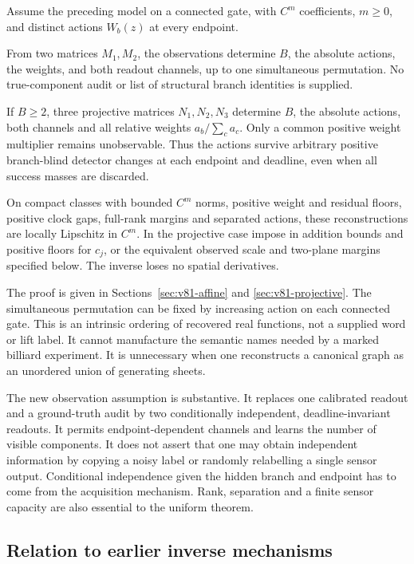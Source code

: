 \begin{theorem}\label{thm:v81-main}
Assume the preceding model on a connected gate, with $C^m$ coefficients,
$m\ge0$, and distinct actions $W_b(z)$ at every endpoint.

From two matrices $M_1,M_2$, the observations determine $B$, the absolute
actions, the weights, and both readout channels, up to one simultaneous
permutation.  No true-component audit or list of structural branch
identities is supplied.

If $B\ge2$, three projective matrices $N_1,N_2,N_3$ determine $B$, the
absolute actions, both channels and all relative weights $a_b/\sum_c a_c$.
Only a common positive weight multiplier remains unobservable.  Thus
the actions survive arbitrary positive branch-blind detector changes at
each endpoint and deadline, even when all success masses are discarded.

On compact classes with bounded $C^m$ norms, positive weight and residual
floors, positive clock gaps, full-rank margins and separated actions,
these reconstructions are locally Lipschitz in $C^m$.  In the projective
case impose in addition bounds and positive floors for $c_j$, or the
equivalent observed scale and two-plane margins specified below.  The
inverse loses no spatial derivatives.
\end{theorem}

The proof is given in Sections~\ref{sec:v81-affine} and
\ref{sec:v81-projective}.  The simultaneous permutation can be fixed by
increasing action on each connected gate.  This is an intrinsic ordering
of recovered real functions, not a supplied word or lift label.  It
cannot manufacture the semantic names needed by a marked billiard
experiment.  It is unnecessary when one reconstructs a canonical graph
as an unordered union of generating sheets.

The new observation assumption is substantive.  It replaces one
calibrated readout and a ground-truth audit by two conditionally
independent, deadline-invariant readouts.  It permits endpoint-dependent
channels and learns the number of visible components.  It does not
assert that one may obtain independent information by copying a noisy
label or randomly relabelling a single sensor output.  Conditional
independence given the hidden branch and endpoint has to come from the
acquisition mechanism.  Rank, separation and a finite sensor capacity
are also essential to the uniform theorem.

\subsection{Relation to earlier inverse mechanisms}

